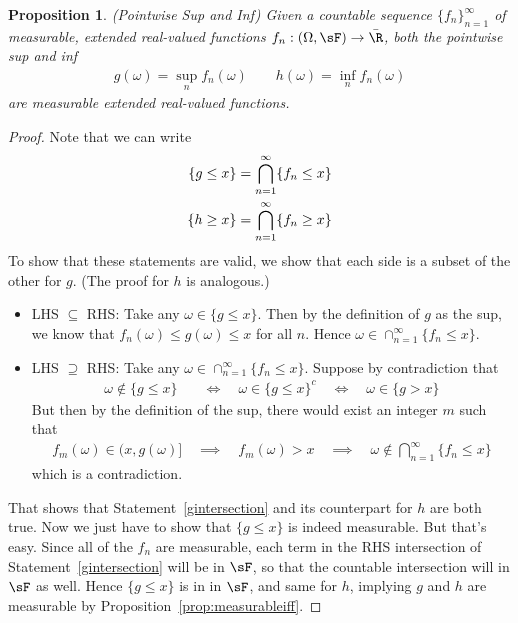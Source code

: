 \documentclass[12pt]{article}
\theoremstyle{plain}
\newtheorem{prop}[thm]{Proposition}
\theoremstyle{definition}
\theoremstyle{remark}
\newcommand{\ra}{\rightarrow}
\newcommand{\ninf}{_{n=1}^\infty}
\begin{document}
\begin{prop}\emph{(Pointwise Sup and Inf)}
Given a countable sequence $\{f_n\}\ninf$ of measurable, extended
real-valued functions $f_n:(\Omega,\sF)\ra\bar{\R}$, both the pointwise
sup and inf
\begin{align*}
  g(\omega) = \sup_n f_n(\omega)
  \qquad
  h(\omega) = \inf_n f_n(\omega)
\end{align*}
are measurable extended real-valued functions.
\end{prop}
\begin{proof}
Note that we can write
\begin{align}
  \{g \leq x \}
  &= \bigcap\ninf \{f_n\leq x\}
  \label{gintersection} \\
  \{h \geq x \}
  &= \bigcap\ninf \{f_n\geq x\}
  \notag
\end{align}
To show that these statements are valid, we show that each side is a
subset of the other for $g$. (The proof for $h$ is analogous.)
\begin{itemize}
  \item LHS $\subseteq$ RHS: Take any $\omega\in\{g\leq x\}$. Then by
    the definition of $g$ as the sup, we know that
    $f_n(\omega)\leq g(\omega)\leq x$ for all $n$.
    Hence $\omega\in \cap\ninf \{f_n \leq x\}$.
  \item LHS $\supseteq$ RHS:
    Take any $\omega\in \cap\ninf \{f_n\leq x\}$. Suppose by
    contradiction that
    \begin{align*}
      \omega\not\in \{g\leq x\}
      \quad&\iff\quad
      \omega\in \{g\leq x\}^c
      \quad\iff\quad
      \omega\in \{g > x\}
    \end{align*}
    But then by the definition of the sup, there would exist an integer
    $m$ such that
    \begin{align*}
      f_m(\omega)\in(x,g(\omega)]
      \quad\implies\quad
      f_m(\omega)>x
      \quad\implies\quad
      \omega\not\in \bigcap\ninf \{f_n\leq x\}
    \end{align*}
    which is a contradiction.
\end{itemize}
That shows that Statement~\ref{gintersection} and its counterpart for
$h$ are both true. Now we just have to show that $\{g\leq x\}$ is indeed
measurable. But that's easy.  Since all of the $f_n$ are measurable,
each term in the RHS intersection of Statement~\ref{gintersection} will
be in $\sF$, so that the countable intersection will in $\sF$ as well.
Hence $\{g\leq x\}$ is in in $\sF$, and same for $h$, implying $g$ and
$h$ are measurable by Proposition~\ref{prop:measurableiff}.
\end{proof}
\end{document}
